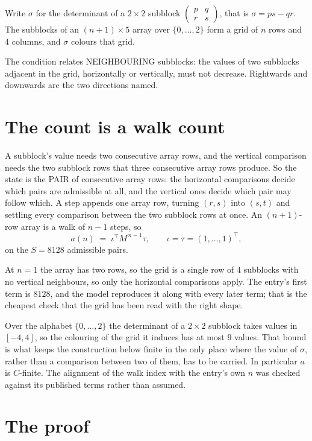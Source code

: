 \documentclass[11pt,a4paper]{article}
\theoremstyle{plain}
\theoremstyle{definition}
\begin{document}
Write $\sigma$ for the determinant of a $2\times2$ subblock
$\begin{pmatrix}p&q\\r&s\end{pmatrix}$, that is $\sigma=ps-qr$. The subblocks of an
$(n+1)\times5$ array over $\{0,\dots,2\}$ form a grid of $n$ rows and $4$
columns, and $\sigma$ colours that grid.

The condition relates NEIGHBOURING subblocks: the values of two subblocks adjacent in the grid,
horizontally or vertically, must not decrease. Rightwards and downwards are the two directions named.

\section{The count is a walk count}

A subblock's value needs two consecutive array rows, and the vertical
comparison needs the two subblock rows that three consecutive array rows produce. So the state
is the PAIR of consecutive array rows: the horizontal comparisons decide which pairs are
admissible at all, and the vertical ones decide which pair may follow which. A step appends one
array row, turning $(r,s)$ into $(s,t)$ and settling every comparison between the two subblock
rows at once. An $(n+1)$-row array is a walk of $n-1$ steps, so
\[
a(n)\;=\;\iota^{\!\top}M^{\,n-1}\tau,\qquad\iota=\tau=(1,\dots,1)^{\!\top},
\]
on the $S=8128$ admissible pairs.

At $n=1$ the array has two rows, so the grid is a single row of $4$
subblocks with no vertical neighbours, so only the horizontal comparisons apply. The
entry's first term is $8128$, and the model reproduces it along with every later term; that
is the cheapest check that the grid has been read with the right shape.

Over the alphabet $\{0,\dots,2\}$ the determinant of a $2\times2$ subblock takes values in
$[-4,4]$, so the colouring of the grid it induces has at most $9$ values.
That bound is what keeps the construction below finite in the only place where the value of
$\sigma$, rather than a comparison between two of them, has to be carried.
In particular $a$ is $C$-finite. The alignment of the walk index with the entry's own $n$ was
checked against its published terms rather than assumed.

\section{The proof}
\end{document}
